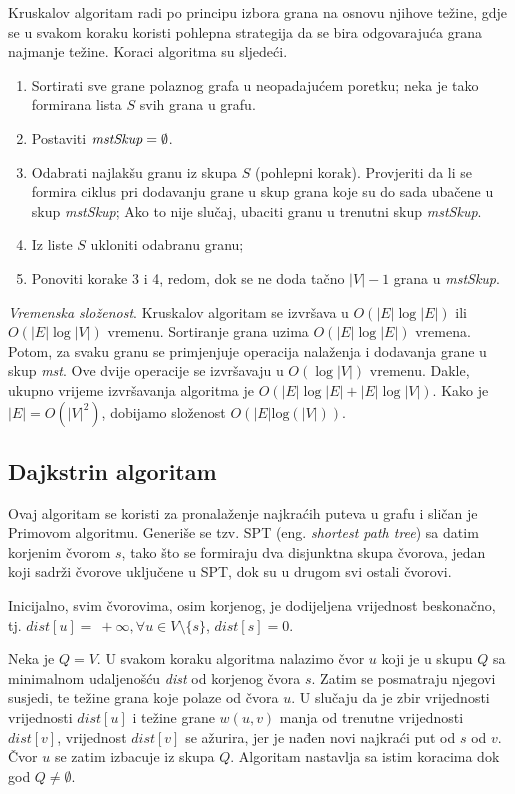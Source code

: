 \documentclass[b5paper, utf8, 11pt, colorlinks]{book}
\theoremstyle{definition}
\begin{document}
Kruskalov algoritam radi po principu izbora grana na osnovu njihove težine, gdje se u svakom koraku koristi pohlepna strategija da se bira odgovarajuća grana najmanje težine.
Koraci algoritma su sljedeći. 
 

\begin{enumerate} 
	
	\item Sortirati sve grane polaznog grafa u neopadajućem poretku; neka je tako formirana lista $S$ svih grana u grafu.
	\item Postaviti $\emph{mstSkup} = \emptyset$. 
	\item Odabrati najlakšu granu iz skupa $S$ (pohlepni korak). Provjeriti da li se formira ciklus pri dodavanju grane u skup grana koje su do sada ubačene u skup \emph{mstSkup}; Ako to nije slučaj, ubaciti granu u trenutni skup \emph{mstSkup}. 
	\item Iz liste $S$ ukloniti odabranu granu;
	\item Ponoviti korake 3 i 4, redom, dok se ne doda tačno $|V|-1$ grana u \emph{mstSkup}.
\end{enumerate} 

 \emph{Vremenska složenost}. Kruskalov algoritam se izvršava u $O(|E|\log |E|)$ ili $O(|E|\log |V|)$ vremenu. Sortiranje grana uzima $O(|E| \log|E|)$ vremena. Potom, za svaku granu 
se primjenjuje operacija nalaženja i dodavanja grane u skup \emph{mst}. Ove dvije operacije se izvršavaju u $O(\log |V|)$ vremenu. Dakle, ukupno vrijeme izvršavanja algoritma je $O(|E|\log |E| + |E|\log |V|)$.   Kako je $|E|=O(|V|^2)$, dobijamo složenost $O(|E| \mathrm{log}(|V|))$. 

\subsection{Dajkstrin algoritam}

Ovaj algoritam se koristi za pronalaženje najkraćih puteva u grafu i sličan je Primovom algoritmu. Generiše se tzv. SPT (eng. \emph{shortest path tree}) sa datim korjenim čvorom $s$, tako  što se formiraju dva disjunktna skupa čvorova, jedan koji sadrži čvorove uključene u SPT, dok su u drugom svi ostali čvorovi. 


Inicijalno, svim čvorovima, osim korjenog, je dodijeljena vrijednost beskonačno, tj. $dist[u]=\ +\infty, \forall u \in V\setminus \{s\}$, $dist[s]=0$. 

Neka je $Q = V$.  
U svakom koraku algoritma nalazimo čvor $u$ koji je u skupu $Q$ sa minimalnom udaljenošću \emph{dist} od korjenog čvora $s$. Zatim se posmatraju njegovi susjedi, te težine grana koje polaze od čvora $u$. U slučaju da je zbir vrijednosti vrijednosti $dist[u]$  i težine grane $w(u,v)$ manja od trenutne vrijednosti $dist[v]$, vrijednost $dist[v]$ se ažurira, jer je nađen novi najkraći put od $s$ od $v$.  Čvor $u$ se zatim izbacuje iz skupa $Q$. Algoritam nastavlja sa istim koracima dok god $Q \neq \emptyset$. 
\end{document}
